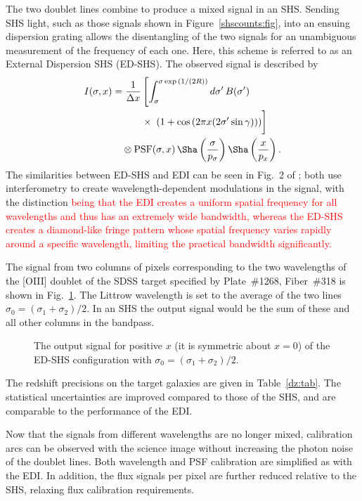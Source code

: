 \documentclass[preprint2, 10pt]{aastex}
\begin{document}
The two doublet lines combine to produce a mixed signal in an SHS.  Sending SHS light, such as those signals shown
in  Figure~\ref{shscounts:fig}, into an ensuing dispersion grating
allows the disentangling of the two signals for an unambiguous measurement of the frequency of each one.  Here, 
this scheme is 
referred to as an External Dispersion SHS (ED-SHS).
The observed signal is described by
\begin{align}
I(\sigma,x) &= \frac{1}{\Delta x}\left[\int^{\sigma \exp{\left(1/(2R)\right)}}_{\sigma} d\sigma'\,B(\sigma') \right.\nonumber\\ 
& \quad\qquad \times \left.\vphantom{\int_{0}^{\infty}} \left(1+\cos{\left(2 \pi x (2\sigma' \sin{\gamma})\right)}\right) \right] \nonumber\\ 
& \quad \otimes \mbox{PSF}(\sigma,x)\, \Sha\left(\frac{\sigma}{p_\sigma}\right) \Sha\left(\frac{x}{p_x}\right).
\label{edishssig:eqn}
\end{align}
The similarities between ED-SHS and EDI can be seen in Fig.~2 of \citet{2003PASP..115..255E}; both use
interferometry to create wavelength-dependent modulations in the signal, with the distinction
\textcolor{red}
{being that the EDI creates a uniform spatial frequency for all wavelengths and thus has an extremely wide bandwidth, whereas the ED-SHS creates a diamond-like fringe pattern whose spatial frequency varies rapidly around a specific 
wavelength, limiting the practical bandwidth significantly.}


The signal from two columns of pixels corresponding to the two wavelengths of
the [OIII] doublet of the
SDSS target specified by Plate~\#1268, Fiber~\#318 is shown in Fig.~\ref{edshs:fig}.
The Littrow wavelength is set to the average of the two lines  $\sigma_0=(\sigma_1+\sigma_2)/2$.
In an SHS the output signal would be the sum of these and all other columns in the bandpass.


\begin{figure}[t]
   \centering
   \caption{The output signal for positive $x$ (it is symmetric about
$x=0$) of the ED-SHS configuration with 
    $\sigma_0=(\sigma_1+\sigma_2)/2$. 
\label{edshs:fig}}
\end{figure} 


The redshift precisions on the target galaxies are given in Table~\ref{dz:tab}.  The statistical uncertainties are improved compared to those of the
SHS, and are comparable to the performance of the EDI.

Now that the signals from different wavelengths are no longer mixed, calibration arcs can be observed with the science image without increasing
the photon noise of the doublet lines.  Both wavelength and PSF calibration are simplified as with the EDI.
In addition, the flux signals per pixel are further reduced relative to the SHS, relaxing flux calibration requirements. 
\end{document}
